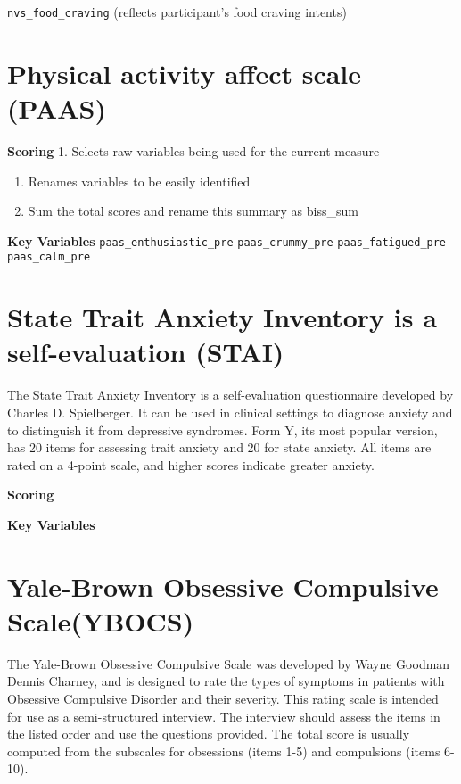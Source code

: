 \documentclass[
]{book}
\begin{document}
\texttt{nvs\_food\_craving} (reflects participant's food craving intents)

\hypertarget{physical-activity-affect-scale-paas}{%
\section{Physical activity affect scale (PAAS)}\label{physical-activity-affect-scale-paas}}

\textbf{Scoring}
1. Selects raw variables being used for the current measure

\begin{enumerate}
\def\labelenumi{\arabic{enumi}.}
\setcounter{enumi}{1}
\item
  Renames variables to be easily identified
\item
  Sum the total scores and rename this summary as biss\_sum
\end{enumerate}

\textbf{Key Variables}
\texttt{paas\_enthusiastic\_pre}
\texttt{paas\_crummy\_pre}
\texttt{paas\_fatigued\_pre}
\texttt{paas\_calm\_pre}

\hypertarget{state-trait-anxiety-inventory-is-a-self-evaluation-stai}{%
\section{State Trait Anxiety Inventory is a self-evaluation (STAI)}\label{state-trait-anxiety-inventory-is-a-self-evaluation-stai}}

The State Trait Anxiety Inventory is a self-evaluation questionnaire developed by Charles D. Spielberger. It can be used in clinical settings to diagnose anxiety and to distinguish it from depressive syndromes. Form Y, its most popular version, has 20 items for assessing trait anxiety and 20 for state anxiety. All items are rated on a 4-point scale, and higher scores indicate greater anxiety.

\textbf{Scoring}

\textbf{Key Variables}

\hypertarget{yale-brown-obsessive-compulsive-scaleybocs}{%
\section{Yale-Brown Obsessive Compulsive Scale(YBOCS)}\label{yale-brown-obsessive-compulsive-scaleybocs}}

The Yale-Brown Obsessive Compulsive Scale was developed by Wayne Goodman Dennis Charney, and is designed to rate the types of symptoms in patients with Obsessive Compulsive Disorder and their severity. This rating scale is intended for use as a semi-structured interview. The interview should assess the items in the listed order and use the questions provided. The total score is usually computed from the subscales for obsessions (items 1-5) and compulsions (items 6-10).
\end{document}

